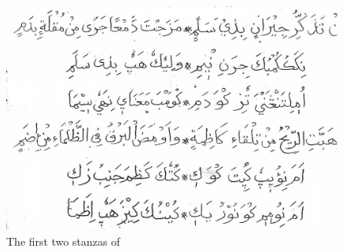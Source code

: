 \begin{figure}[h]
    \centering
    \includegraphics{../convert/inputs/burda/burda.jpg}
	\caption{The first two stanzas of }
\end{figure}


\renewcommand\thefootnote{\textcolor{red}{\arabic{footnote}}}  %
